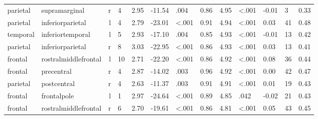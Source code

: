 \documentclass{article}
\begin{document}
\begin{longtable}{llrR{1.3cm}R{1cm}R{1.3cm}R{1cm}R{1cm}R{1.3cm}R{1cm}R{1.8cm}R{1.3cm}R{1.8cm}}
  parietal &             supramarginal &    r &         4 &                  2.95 &           -11.54 &               .004 &                               0.86 &                          4.95 &                   \textless.001 &  -0.01 &      3 &      0.33 \\
  parietal &          inferiorparietal &    l &         4 &                  2.79 &           -23.01 &      \textless.001 &                               0.91 &                          4.94 &                   \textless.001 &   0.03 &     41 &      0.48 \\
  temporal &          inferiortemporal &    l &         5 &                  2.93 &           -17.10 &               .004 &                               0.85 &                          4.93 &                   \textless.001 &  -0.01 &     13 &      0.42 \\
  parietal &          inferiorparietal &    r &         8 &                  3.03 &           -22.95 &      \textless.001 &                               0.86 &                          4.93 &                   \textless.001 &   0.03 &     13 &      0.41 \\
   frontal &      rostralmiddlefrontal &    l &        10 &                  2.71 &           -22.20 &      \textless.001 &                               0.86 &                          4.92 &                   \textless.001 &   0.08 &     36 &      0.44 \\
   frontal &                precentral &    r &         4 &                  2.87 &           -14.02 &               .003 &                               0.96 &                          4.92 &                   \textless.001 &   0.00 &     42 &      0.47 \\
  parietal &               postcentral &    r &         4 &                  2.63 &           -11.37 &               .003 &                               0.91 &                          4.91 &                   \textless.001 &   0.01 &     19 &      0.43 \\
   frontal &               frontalpole &    l &         1 &                  2.97 &           -24.64 &      \textless.001 &                               0.89 &                          4.85 &                            .042 &  -0.02 &     21 &      0.43 \\
   frontal &      rostralmiddlefrontal &    r &         6 &                  2.70 &           -19.61 &      \textless.001 &                               0.86 &                          4.81 &                   \textless.001 &   0.05 &     43 &      0.45 \\

\end{longtable}
\end{document}
